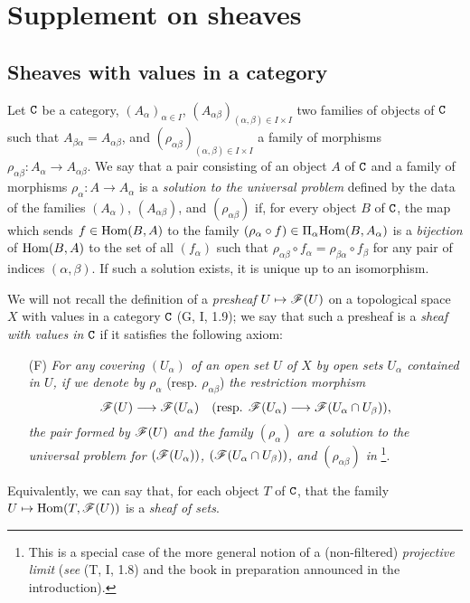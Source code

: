 \section{Supplement on sheaves}
\label{section:0.3}

\subsection{Sheaves with values in a category}
\label{subsection:0.3.1}

\begin{env}[3.1.1]
\label{0.3.1.1}
Let $\mathtt{C}$ be a category, $(A_\alpha)_{\alpha\in I}$,
$(A_{\alpha\beta})_{(\alpha,\beta)\in I\times I}$ two families of objects of
$\mathtt{C}$ such that $A_{\beta\alpha}=A_{\alpha\beta}$, and
$(\rho_{\alpha\beta})_{(\alpha,\beta)\in I\times I}$ a family of morphisms
$\rho_{\alpha\beta}:A_\alpha\to A_{\alpha\beta}$. We say that a pair consisting
of an object $A$ of $\mathtt{C}$ and a family of morphisms $\rho_\alpha:A\to A_\alpha$
is a \emph{solution to the universal problem} defined by the data of the
families $(A_\alpha)$, $(A_{\alpha\beta})$, and $(\rho_{\alpha\beta})$ if, for
every object $B$ of $\mathtt{C}$, the map which sends $f\in{\mathop{\mathrm{Hom}}\nolimits}(B,A)$ to the family
$(\rho_\alpha\circ f)\in\Pi_\alpha{\mathop{\mathrm{Hom}}\nolimits}(B,A_\alpha)$ is a \emph{bijection} of
${\mathop{\mathrm{Hom}}\nolimits}(B,A)$ to the set of all $(f_\alpha)$ such that
$\rho_{\alpha\beta}\circ f_\alpha=\rho_{\beta\alpha}\circ f_\beta$ for any pair
of indices $(\alpha,\beta)$. If such a solution exists, it is unique up to an
isomorphism.
\end{env}

\begin{env}[3.1.2]
\label{0.3.1.2}
We will not recall the definition of a \emph{presheaf} $U\mapsto\sh{F}(U)$ on a
topological space $X$ with values in a category $\mathtt{C}$ (G, I, 1.9); we say that
such a presheaf is a \emph{sheaf with values in} $\mathtt{C}$ if it satisfies the
following axiom:
\begin{enumerate}
  \item[(F)] \emph{For any covering $(U_\alpha)$ of an open set $U$ of $X$ by open sets $U_\alpha$ contained in $U$, if we denote by $\rho_\alpha$} (resp. $\rho_{\alpha\beta}$) \emph{the restriction morphism}
    \[
      \sh{F}(U)\to\sh{F}(U_\alpha)
      \quad(\text{resp. }\sh{F}(U_\alpha)\to\sh{F}(U_\alpha\cap U_\beta)),
    \]
    \emph{the pair formed by $\mathscr{F}(U)$ and the family $(\rho_\alpha)$ are a
    solution to the universal problem for $(\mathscr{F}(U_\alpha))$,
    $(\mathscr{F}(U_\alpha\cap U_\beta))$, and $(\rho_{\alpha\beta})$ in
    }\footnote{This is a special case of the more general
    notion of a (non-filtered) \emph{projective limit} (\emph{see} (T, I, 1.8)
    and the book in preparation announced in the introduction).}.\\
\end{enumerate}

Equivalently, we can say that, for each object $T$ of $\mathtt{C}$, that the family $U\mapsto\Hom(T,\sh{F}(U))$ is a \emph{sheaf of sets}.
\end{env}


